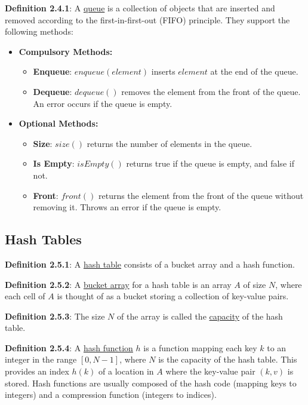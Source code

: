 \documentclass{article}
\newcommand{\separate}[1] {\vspace{#1 pt}\noindent}
\newcommand{\definition}[2]{\textbf{Definition #1}: #2\label{def:#1}}
\begin{document}
\definition{2.4.1}{A \underline{queue} is a collection of objects that are inserted and removed according to the first-in-first-out (FIFO) principle.} They support the following methods:
\begin{itemize}
    \item \textbf{Compulsory Methods:}
    \begin{itemize}
        \item \textbf{Enqueue}: \(enqueue(element)\) inserts \(element\) at the end of the queue.
        \item \textbf{Dequeue}: \(dequeue()\) removes the element from the front of the queue. An error occurs if the queue is empty.
    \end{itemize}
    \item \textbf{Optional Methods:}
    \begin{itemize}
        \item \textbf{Size}: \(size()\) returns the number of elements in the queue.
        \item \textbf{Is Empty}: \(isEmpty()\) returns true if the queue is empty, and false if not.
        \item \textbf{Front}: \(front()\) returns the element from the front of the queue without removing it. Throws an error if the queue is empty.
    \end{itemize}
\end{itemize}

\subsection{Hash Tables}

\definition{2.5.1}{A \underline{hash table} consists of a bucket array and a hash function.}

\separate{5}\definition{2.5.2}{A \underline{bucket array} for a hash table is an array \(A\) of size \(N\), where each cell of \(A\) is thought of as a bucket storing a collection of key-value pairs.} 

\separate{5}\definition{2.5.3}{The size \(N\) of the array is called the \underline{capacity} of the hash table.}

\separate{5}\definition{2.5.4}{A \underline{hash function} \(h\) is a function mapping each key \(k\) to an integer in the range \([0,N-1]\), where \(N\) is the capacity of the hash table. This provides an index \(h(k)\) of a location in \(A\) where the key-value pair \((k,v)\) is stored. Hash functions are usually composed of the hash code (mapping keys to integers) and a compression function (integers to indices).}
\end{document}
